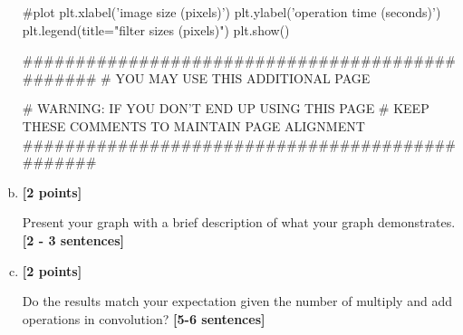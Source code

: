 \documentclass[11pt]{article}
\begin{document}
\begin{enumerate}[(a)]
\begin{tcolorbox}[enhanced jigsaw,breakable,pad at break*=1mm,colback=white!5!white,colframe=green!75!black,height fixed for=all]
\begin{python}
#plot
plt.xlabel('image size (pixels)')
plt.ylabel('operation time (seconds)')
plt.legend(title="filter sizes (pixels)")
plt.show()

################################################
# YOU MAY USE THIS ADDITIONAL PAGE

# WARNING: IF YOU DON'T END UP USING THIS PAGE
# KEEP THESE COMMENTS TO MAINTAIN PAGE ALIGNMENT
################################################

\end{python}


\end{tcolorbox}
    \item \textbf{[2 points]}
    \begin{tcolorbox}[colback=orange!5!white,colframe=orange!75!black]
    Present your graph with a brief description of what your graph demonstrates. \textbf{[2 - 3 sentences]}
    \end{tcolorbox}

    

\item \textbf{[2 points]} 
\begin{tcolorbox}[colback=orange!5!white,colframe=orange!75!black]
Do the results match your expectation given the number of multiply and add operations in convolution? \textbf{[5-6 sentences]}
\end{tcolorbox}
    

\end{enumerate}
\end{document}
